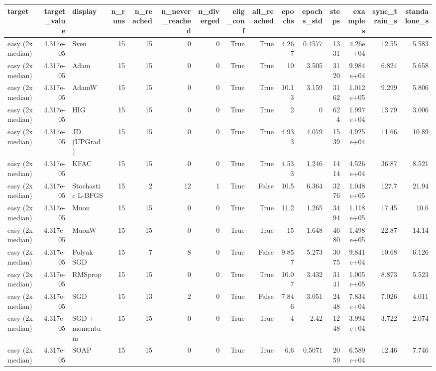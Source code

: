 \begin{tabular}{lrlrrrrrrrrrrrr}
\toprule
target & target\_value & display & n\_runs & n\_reached & n\_never\_reached & n\_diverged & elig\_conf & all\_reached & epochs & epochs\_std & steps & examples & sync\_train\_s & standalone\_s \\
\midrule
easy (2x median) & 4.317e-05 & Sven & 15 & 15 & 0 & 0 & True & True & 4.267 & 0.4577 & 1331 & 4.26e+04 & 12.55 & 5.583 \\
easy (2x median) & 4.317e-05 & Adam & 15 & 15 & 0 & 0 & True & True & 10 & 3.505 & 3120 & 9.984e+04 & 6.824 & 5.658 \\
easy (2x median) & 4.317e-05 & AdamW & 15 & 15 & 0 & 0 & True & True & 10.13 & 3.159 & 3162 & 1.012e+05 & 9.299 & 5.806 \\
easy (2x median) & 4.317e-05 & HIG & 15 & 15 & 0 & 0 & True & True & 2 & 0 & 624 & 1.997e+04 & 13.79 & 3.006 \\
easy (2x median) & 4.317e-05 & JD (UPGrad) & 15 & 15 & 0 & 0 & True & True & 4.933 & 4.079 & 1539 & 4.925e+04 & 11.66 & 10.89 \\
easy (2x median) & 4.317e-05 & KFAC & 15 & 15 & 0 & 0 & True & True & 4.533 & 1.246 & 1414 & 4.526e+04 & 36.87 & 8.521 \\
easy (2x median) & 4.317e-05 & Stochastic L-BFGS & 15 & 2 & 12 & 1 & True & False & 10.5 & 6.364 & 3276 & 1.048e+05 & 127.7 & 21.94 \\
easy (2x median) & 4.317e-05 & Muon & 15 & 15 & 0 & 0 & True & True & 11.2 & 1.265 & 3494 & 1.118e+05 & 17.45 & 10.6 \\
easy (2x median) & 4.317e-05 & MuonW & 15 & 15 & 0 & 0 & True & True & 15 & 1.648 & 4680 & 1.498e+05 & 22.87 & 14.14 \\
easy (2x median) & 4.317e-05 & Polyak SGD & 15 & 7 & 8 & 0 & True & False & 9.857 & 5.273 & 3075 & 9.841e+04 & 10.68 & 6.126 \\
easy (2x median) & 4.317e-05 & RMSprop & 15 & 15 & 0 & 0 & True & True & 10.07 & 3.432 & 3141 & 1.005e+05 & 8.873 & 5.523 \\
easy (2x median) & 4.317e-05 & SGD & 15 & 13 & 2 & 0 & True & False & 7.846 & 3.051 & 2448 & 7.834e+04 & 7.026 & 4.011 \\
easy (2x median) & 4.317e-05 & SGD + momentum & 15 & 15 & 0 & 0 & True & True & 4 & 2.42 & 1248 & 3.994e+04 & 3.722 & 2.074 \\
easy (2x median) & 4.317e-05 & SOAP & 15 & 15 & 0 & 0 & True & True & 6.6 & 0.5071 & 2059 & 6.589e+04 & 12.46 & 7.746 \\

\end{tabular}
